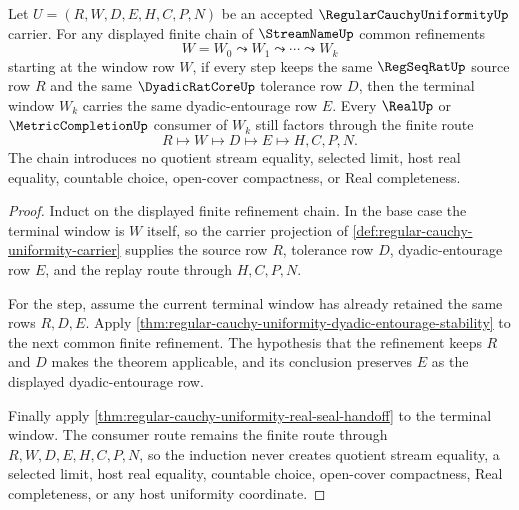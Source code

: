 \begin{theorem}
\label{thm:regular-cauchy-uniformity-common-refinement-transitivity}
Let $U=(R,W,D,E,H,C,P,N)$ be an accepted $\RegularCauchyUniformityUp$ carrier. For any displayed finite chain of $\StreamNameUp$ common refinements
$$
W=W_0 \leadsto W_1 \leadsto \cdots \leadsto W_k
$$
starting at the window row $W$, if every step keeps the same $\RegSeqRatUp$ source row $R$ and the same $\DyadicRatCoreUp$ tolerance row $D$, then the terminal window $W_k$ carries the same dyadic-entourage row $E$. Every $\RealUp$ or $\MetricCompletionUp$ consumer of $W_k$ still factors through the finite route
$$
R \longmapsto W \longmapsto D \longmapsto E \longmapsto H,C,P,N .
$$
The chain introduces no quotient stream equality, selected limit, host real equality, countable choice, open-cover compactness, or Real completeness.
\end{theorem}
\begin{proof}
Induct on the displayed finite refinement chain. In the base case the terminal window is $W$ itself, so the carrier projection of \autoref{def:regular-cauchy-uniformity-carrier} supplies the source row $R$, tolerance row $D$, dyadic-entourage row $E$, and the replay route through $H,C,P,N$.

For the step, assume the current terminal window has already retained the same rows $R,D,E$. Apply \autoref{thm:regular-cauchy-uniformity-dyadic-entourage-stability} to the next common finite refinement. The hypothesis that the refinement keeps $R$ and $D$ makes the theorem applicable, and its conclusion preserves $E$ as the displayed dyadic-entourage row.

Finally apply \autoref{thm:regular-cauchy-uniformity-real-seal-handoff} to the terminal window. The consumer route remains the finite route through $R,W,D,E,H,C,P,N$, so the induction never creates quotient stream equality, a selected limit, host real equality, countable choice, open-cover compactness, Real completeness, or any host uniformity coordinate.
\end{proof}

